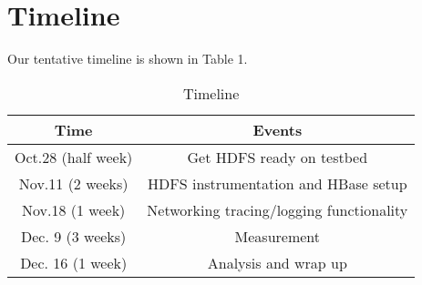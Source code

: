 \section{Timeline}
\label{section:timeline}

Our tentative timeline is shown in Table 1.

\begin{table}[!thb]
\centering
\begin{tabular}{|c|c|} \hline
Time & Events\\ \hline
Oct.28 (half week) & Get HDFS ready on testbed\\ \hline
Nov.11 (2 weeks) & HDFS instrumentation and HBase setup\\ \hline
Nov.18 (1 week) & Networking tracing/logging functionality\\ \hline
Dec. 9 (3 weeks) & Measurement\\ \hline
Dec. 16 (1 week) & Analysis and wrap up\\ \hline
\end{tabular}\label{timeline}
\caption{Timeline}
\end{table}


